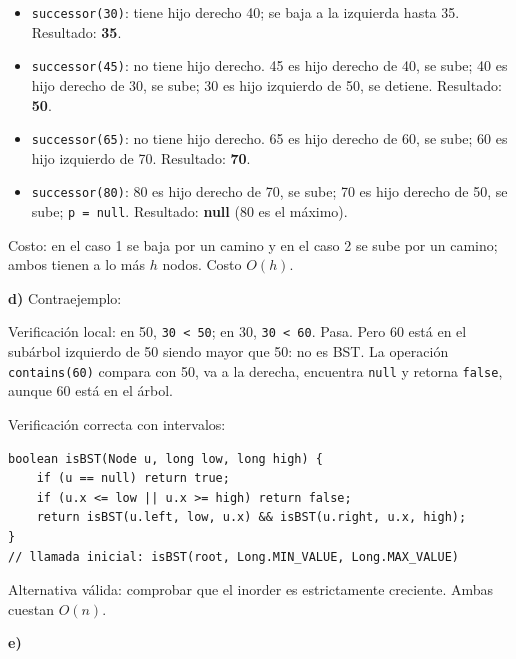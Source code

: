 \documentclass[11pt,a4paper]{article}
\begin{document}
\begin{itemize}[itemsep=1pt]
\item \texttt{successor(30)}: tiene hijo derecho 40; se baja a la izquierda hasta 35. Resultado: \textbf{35}.
\item \texttt{successor(45)}: no tiene hijo derecho. 45 es hijo derecho de 40, se sube; 40 es hijo derecho de 30, se sube; 30 es hijo izquierdo de 50, se detiene. Resultado: \textbf{50}.
\item \texttt{successor(65)}: no tiene hijo derecho. 65 es hijo derecho de 60, se sube; 60 es hijo izquierdo de 70. Resultado: \textbf{70}.
\item \texttt{successor(80)}: 80 es hijo derecho de 70, se sube; 70 es hijo derecho de 50, se sube; \texttt{p = null}. Resultado: \textbf{null} (80 es el máximo).
\end{itemize}
Costo: en el caso 1 se baja por un camino y en el caso 2 se sube por un camino; ambos tienen a lo más $h$ nodos. Costo $O(h)$.

\textbf{d)} Contraejemplo:

\begin{center}
\end{center}

Verificación local: en 50, \texttt{30 < 50}; en 30, \texttt{30 < 60}. Pasa. Pero 60 está en el subárbol izquierdo de 50 siendo mayor que 50: no es BST. La operación \texttt{contains(60)} compara con 50, va a la derecha, encuentra \texttt{null} y retorna \texttt{false}, aunque 60 está en el árbol.

Verificación correcta con intervalos:
\begin{lstlisting}
boolean isBST(Node u, long low, long high) {
    if (u == null) return true;
    if (u.x <= low || u.x >= high) return false;
    return isBST(u.left, low, u.x) && isBST(u.right, u.x, high);
}
// llamada inicial: isBST(root, Long.MIN_VALUE, Long.MAX_VALUE)
\end{lstlisting}
Alternativa válida: comprobar que el inorder es estrictamente creciente. Ambas cuestan $O(n)$.

\textbf{e)}
\end{document}
